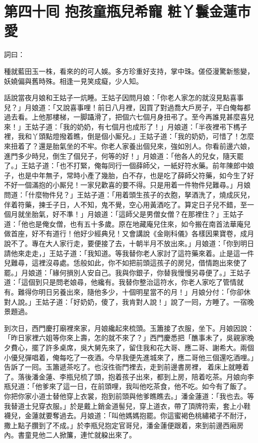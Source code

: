 
\chapter*{第四十囘 抱孩童瓶兒希寵 粧丫鬟金蓮市愛}


詞曰：

\begin{myquote}
種就藍田玉一株，看來的的可人娛。多方珍重好支持，掌中珠。傞俹漫驚新態變，妖嬈偏與舊時殊。相逢一見笑成癡，少人知。

\end{myquote}

話說當夜月娘和王姑子一炕睡。王姑子因問月娘：「你老人家怎的就沒見點喜事兒？」月娘道：「又說喜事哩！前日八月裡，因買了對過喬大戶房子，平白俺每都過去看。上他那樓梯，一脚躡滑了，把個六七個月身扭弔了。至今再誰見甚麼喜兒來！」王姑子道：「我的奶奶，有七個月也成形了！」月娘道：「半夜裡弔下榪子裡，我和丫頭點燈撥着瞧，倒是個小厮兒。」王姑子道：「我的奶奶，可惜了！怎麼來扭着了？還是胎氣坐的不牢。{}你老人家養出個兒來，強如別人。你看前邊六娘，進門多少時兒，倒生了個兒子，何等的好！」月娘道：「他各人的兒女，隨天罷了。」王姑子道：「也不打緊，俺每同行一個薛師父，一紙好符水藥。前年陳郎中娘子，也是中年無子，常時小產了幾胎，白不存，也是吃了薛師父符藥，如今生了好不好一個滿抱的小厮兒！一家兒歡喜的要不得。只是用着一件物件兒難尋。」月娘問道：「什麼物件兒？」王姑子道：「用着頭生孩子的衣胞，拏酒洗了，燒成灰兒，伴着符藥，揀壬子日，人不知，鬼不覺，空心用黃酒吃了。算定日子兒不錯，至一個月就坐胎氣，好不準！」月娘道：「這師父是男僧女僧？在那裡住？」王姑子道：「他也是俺女僧，也有五十多歲。原在地藏庵兒住來，如今搬在南首法華庵兒做首座，好不有道行！他好少經典兒！又會講說《金剛科儀》各樣因果寶卷，成月說不了。專在大人家行走，要便接了去，十朝半月不放出來。」月娘道：「你到明日請他來走走，」王姑子道：「我知道。等我替你老人家討了這符藥來着。止是這一件兒難尋，這裡沒尋處。恁般如此，你不如把前頭這孩子的房兒，借情跑出來使了罷。」月娘道：「緣何損別人安自己。我與你銀子，你替我慢慢另尋便了。」王姑子道：「這個到只是問老娘尋，他纔有。我替你整治這符水，你老人家吃了管情就有。難得你明日另養出來，隨他多少，十個明星當不的月！」月娘分付：「你卻休對人說。」王姑子道：「好奶奶，傻了，我肯對人說！」說了一囘，方睡了。一宿晚景題過。

到次日，西門慶打廟裡來家，月娘纔起來梳頭。玉簫接了衣服，坐下。月娘因說：「昨日家裡六姐等你來上壽，怎的就不來了？」西門慶悉把「醮事未了，吳親家晚夕費心，擺了許多桌席，吳大舅先來了，留住我和花大哥、應二哥、謝希大。兩個小優兒彈唱着，俺每吃了一夜酒。今早我便先進城來了，應二哥他三個還吃酒哩。」告訴了一囘。玉簫遞茶吃了。也沒徃衙門裡去，走到前邊書房裡，𢱉着床上就睡着了。落後潘金蓮、李瓶兒梳了頭，抱着孩子出來，都到上房，陪着吃茶。月娘向李瓶兒道：「他爹來了這一日，在前頭哩，我叫他吃茶食，他不吃。如今有了飯了。你把你家小道士替他穿上衣裳，抱到前頭與他爹瞧瞧去。」潘金蓮道：「我也去。等我替道士兒穿衣服。」{}於是戴上銷金道髻兒，穿上道衣，帶了頂牌符索，套上小鞋襪兒，金蓮就要奪過去。月娘道：「叫他媽媽抱罷。你這蜜褐色桃繡裙子不耐汙，撒上點子臢到了不成。」於李瓶兒抱定官哥兒，潘金蓮便跟着，來到前邊西廂房內。書童見他二人掀簾，連忙就躱出來了。

